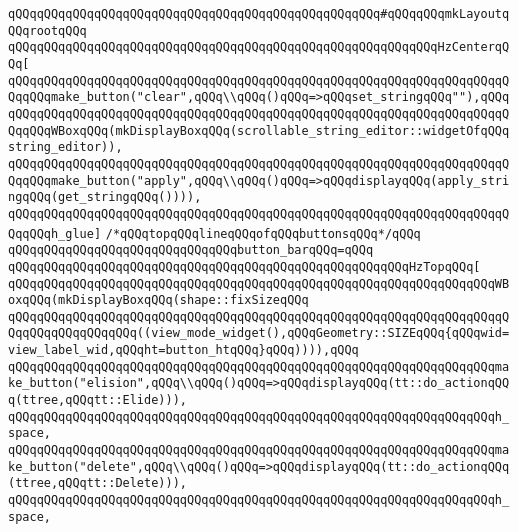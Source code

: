 \verb|qQQqqQQqqQQqqQQqqQQqqQQqqQQqqQQqqQQqqQQqqQQqqQQqqQQq#qQQqqQQqmkLayoutqQQqrootqQQq|\newline
\verb|qQQqqQQqqQQqqQQqqQQqqQQqqQQqqQQqqQQqqQQqqQQqqQQqqQQqqQQqqQQqHzCenterqQQq[|\newline
\verb|qQQqqQQqqQQqqQQqqQQqqQQqqQQqqQQqqQQqqQQqqQQqqQQqqQQqqQQqqQQqqQQqqQQqqQQqqQQqmake_button("clear",qQQq\\qQQq()qQQq=>qQQqset_stringqQQq""),qQQq|\newline
\verb|qQQqqQQqqQQqqQQqqQQqqQQqqQQqqQQqqQQqqQQqqQQqqQQqqQQqqQQqqQQqqQQqqQQqqQQqqQQqWBoxqQQq(mkDisplayBoxqQQq(scrollable_string_editor::widgetOfqQQqstring_editor)),|\newline
\verb|qQQqqQQqqQQqqQQqqQQqqQQqqQQqqQQqqQQqqQQqqQQqqQQqqQQqqQQqqQQqqQQqqQQqqQQqqQQqmake_button("apply",qQQq\\qQQq()qQQq=>qQQqdisplayqQQq(apply_stringqQQq(get_stringqQQq()))),|\newline
\verb|qQQqqQQqqQQqqQQqqQQqqQQqqQQqqQQqqQQqqQQqqQQqqQQqqQQqqQQqqQQqqQQqqQQqqQQqqQQqh_glue]|\newline
\newline
\verb|/*qQQqtopqQQqlineqQQqofqQQqbuttonsqQQq*/qQQq|\newline
\verb|qQQqqQQqqQQqqQQqqQQqqQQqqQQqqQQqbutton_barqQQq=qQQq|\newline
\verb|qQQqqQQqqQQqqQQqqQQqqQQqqQQqqQQqqQQqqQQqqQQqqQQqqQQqqQQqHzTopqQQq[|\newline
\verb|qQQqqQQqqQQqqQQqqQQqqQQqqQQqqQQqqQQqqQQqqQQqqQQqqQQqqQQqqQQqqQQqqQQqWBoxqQQq(mkDisplayBoxqQQq(shape::fixSizeqQQq|\newline
\verb|qQQqqQQqqQQqqQQqqQQqqQQqqQQqqQQqqQQqqQQqqQQqqQQqqQQqqQQqqQQqqQQqqQQqqQQqqQQqqQQqqQQqqQQq((view_mode_widget(),qQQqGeometry::SIZEqQQq{qQQqwid=view_label_wid,qQQqht=button_htqQQq}qQQq)))),qQQq|\newline
\verb|qQQqqQQqqQQqqQQqqQQqqQQqqQQqqQQqqQQqqQQqqQQqqQQqqQQqqQQqqQQqqQQqqQQqmake_button("elision",qQQq\\qQQq()qQQq=>qQQqdisplayqQQq(tt::do_actionqQQq(ttree,qQQqtt::Elide))),|\newline
\verb|qQQqqQQqqQQqqQQqqQQqqQQqqQQqqQQqqQQqqQQqqQQqqQQqqQQqqQQqqQQqqQQqqQQqh_space,|\newline
\verb|qQQqqQQqqQQqqQQqqQQqqQQqqQQqqQQqqQQqqQQqqQQqqQQqqQQqqQQqqQQqqQQqqQQqmake_button("delete",qQQq\\qQQq()qQQq=>qQQqdisplayqQQq(tt::do_actionqQQq(ttree,qQQqtt::Delete))),|\newline
\verb|qQQqqQQqqQQqqQQqqQQqqQQqqQQqqQQqqQQqqQQqqQQqqQQqqQQqqQQqqQQqqQQqqQQqh_space,|\newline
